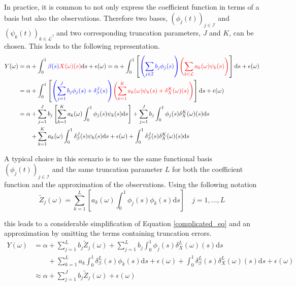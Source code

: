\documentclass[11pt,twoside,a4paper]{article}
\begin{document}
	In practice, it is common to not only express the coefficient function in terms of a basis but also the observations. Therefore two bases, $\left(\phi_j(t)\right)_{j \in \mathcal{I}}$ and $\left(\psi_k(t)\right)_{k \in \mathcal{L}}$, and two corresponding truncation parameters, $J$ and $K$, can be chosen. This leads to the following representation.
	\begin{equation}\label{complicated_eq}
		\begin{split}
			Y(\omega) & = \alpha + \int_{0}^{1} {\color{blue}\beta(s)} {\color{red}X(\omega)(s)}\mathrm{d}s + \epsilon(\omega)
			 = \alpha + \int_{0}^{1}\left[{\color{blue}\left(\sum_{j \in \mathcal{I}} b_j  \phi_j(s)\right)} {\color{red}\left(\sum_{k \in \mathcal{L}} a_k(\omega)  \psi_k(s)\right)} \right]\mathrm{d}s + \epsilon(\omega) \\
			& = \alpha + \int_{0}^{1}\left[{\color{blue}\left(\sum_{j = 1}^{J} b_j  \phi_j(s) + \delta_{\beta}^{J}(s)\right)} {\color{red}\left(\sum_{k = 1}^K a_k(\omega)  \psi_k(s) + \delta_{X}^{K}(\omega)(s)\right)} \right]\mathrm{d}s + \epsilon(\omega)\\
			& = \alpha + \sum_{j = 1}^J b_j \left[\sum_{k = 1}^K a_k(\omega) \int_{0}^{1} \phi_j(s) \psi_k(s) \mathrm{d}s\right] + \sum_{j = 1}^{J} b_j  \int_{0}^{1} \phi_j(s) \delta_{X}^{K}(\omega)(s) \mathrm{d}s\\
			& \quad \quad + \sum_{k = 1}^{K} a_k(\omega)  \int_{0}^{1} \delta_{\beta}^{J}(s)\psi_k(s) \mathrm{d}s + \epsilon(\omega) + \int_{0}^{1}  \delta_{\beta}^{J}(s) \delta_{X}^{K}(\omega)(s) \mathrm{d}s
		\end{split}
	\end{equation}

	\newpage
	A typical choice in this scenario is to use the same functional basis $\left(\phi_j(t)\right)_{j \in \mathcal{I}}$ and the same truncation parameter $L$ for both the coefficient function and the approximation of the observations. Using the following notation 
	\begin{equation}
			\tilde{Z}_j(\omega) = \sum_{k = 1}^{L} \left[a_k(\omega) \int_{0}^{1} \phi_j(s) \phi_k(s) \mathrm{d}s \right] \quad j = 1, \dots, L
	\end{equation}

	this leads to a considerable simplification of Equation \ref{complicated_eq} and an approximation by omitting the terms containing truncation errors.
	\begin{equation}\label{simplified_model_basis_equation}
		\begin{split}
			Y(\omega) &= \alpha + \sum_{j = 1}^{L} b_j \tilde{Z}_j(\omega) + \sum_{j = 1}^{L} b_j  \int_{0}^{1} \phi_j(s) \delta_{X}^{L}(\omega)(s) \mathrm{d}s\\
			& \quad \quad + \sum_{k = 1}^{L} a_k  \int_{0}^{1} \delta_{\beta}^{L}(s)\phi_k(s) \mathrm{d}s + \epsilon(\omega) + \int_{0}^{1}  \delta_{\beta}^{L}(s) \delta_{X}^{L}(\omega)(s) \mathrm{d}s + \epsilon(\omega)\\
			& \approx \alpha + \sum_{j = 1}^{J} b_j \tilde{Z}_j(\omega) + \epsilon(\omega)
		\end{split}
	\end{equation}
\end{document}
